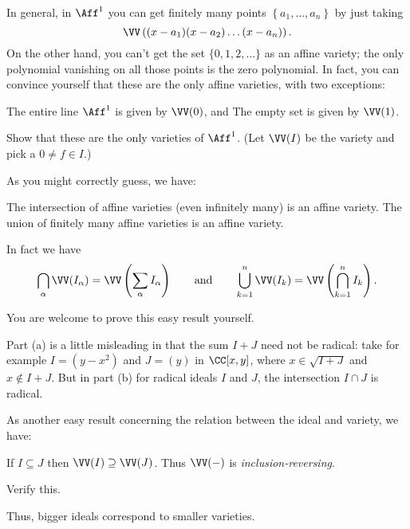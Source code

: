 In general, in $\Aff^1$ you can get finitely
many points $\left\{ a_1, \dots, a_n \right\}$ by
just taking \[ \VV\left( (x-a_1)(x-a_2)\dots(x-a_n) \right). \]
On the other hand, you can't get the set $\{0,1,2,\dots\}$ as an affine variety;
the only polynomial vanishing
on all those points is the zero polynomial.
In fact, you can convince yourself that these
are the only affine varieties, with two exceptions:
\begin{itemize}
	\ii The entire line $\Aff^1$ is given by $\VV(0)$, and
	\ii The empty set is given by $\VV(1)$.
\end{itemize}
\begin{exercise}
	Show that these are the only varieties of $\Aff^1$.
	(Let $\VV(I)$ be the variety and pick a $0 \neq f \in I$.)
\end{exercise}

As you might correctly guess, we have:
\begin{theorem}
	\label{thm:many_aff_variety}
	\listhack
	\begin{enumerate}[(a)]
		\ii The intersection of affine varieties
		(even infinitely many) is an affine variety.
		\ii The union of finitely many affine varieties
		is an affine variety.
	\end{enumerate}
	In fact we have
	\[ \bigcap_\alpha \VV(I_\alpha)
		= \VV\left( \sum_\alpha I_\alpha \right)
		\qquad\text{and}\qquad
		\bigcup_{k=1}^n \VV(I_k)
		= \VV\left( \bigcap_{k=1}^n I_k \right). \]
\end{theorem}
You are welcome to prove this easy result yourself.
\begin{remark}
	Part (a) is a little misleading in that the sum $I+J$ need not be radical:
	take for example $I = (y-x^2)$ and $J = (y)$ in $\CC[x,y]$,
	where $x \in \sqrt{I+J}$ and $x \notin I+J$.
	But in part (b) for radical ideals $I$ and $J$,
	the intersection $I \cap J$ is radical.
\end{remark}

As another easy result concerning the relation between the ideal and variety, we
have:
\begin{proposition}
	If $I \subseteq J$ then $\VV(I) \supseteq \VV(J)$.
	Thus $\VV(-)$ is \emph{inclusion-reversing}.
\end{proposition}
\begin{ques}
	Verify this.
\end{ques}
Thus, bigger ideals correspond to smaller varieties.

